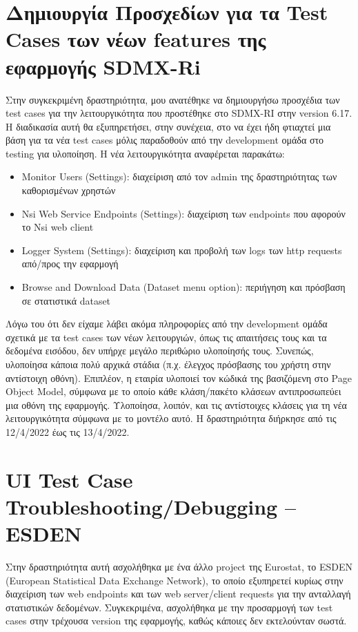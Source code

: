 \section {Δημιουργία Προσχεδίων για τα Test Cases των νέων features της εφαρμογής SDMX-Ri}
Στην συγκεκριμένη δραστηριότητα, μου ανατέθηκε να δημιουργήσω προσχέδια των test cases για την λειτουργικότητα που προστέθηκε στο SDMX-RI στην 
version 6.17. Η διαδικασία αυτή θα εξυπηρετήσει, στην συνέχεια, στο να έχει ήδη φτιαχτεί μια βάση για τα νέα test cases μόλις παραδοθούν από 
την development ομάδα στο testing για υλοποίηση. Η νέα λειτουργικότητα αναφέρεται παρακάτω:
\begin{itemize}
    \item Monitor Users (Settings): διαχείριση από τον admin της δραστηριότητας των καθορισμένων χρηστών
    \item Nsi Web Service Endpoints (Settings): διαχείριση των endpoints που αφορούν το Nsi web client
	\item Logger System (Settings): διαχείριση και προβολή των logs των http requests από/προς την εφαρμογή
	\item Browse and Download Data (Dataset menu option): περιήγηση και πρόσβαση σε στατιστικά dataset
\end{itemize}
Λόγω του ότι δεν είχαμε λάβει ακόμα πληροφορίες από την development ομάδα σχετικά με τα test cases των νέων λειτουργιών, όπως τις απαιτήσεις 
τους και τα δεδομένα εισόδου, δεν υπήρχε μεγάλο περιθώριο υλοποίησής τους. Συνεπώς, υλοποίησα κάποια πολύ αρχικά στάδια (π.χ. έλεγχος πρόσβασης 
του χρήστη στην αντίστοιχη οθόνη). Επιπλέον, η εταιρία υλοποιεί τον κώδικά της βασιζόμενη στο Page Object Model, σύμφωνα με το οποίο κάθε 
κλάση/πακέτο κλάσεων αντιπροσωπεύει μια οθόνη της εφαρμογής. Υλοποίησα, λοιπόν, και τις αντίστοιχες κλάσεις για τη νέα λειτουργικότητα σύμφωνα 
με το μοντέλο αυτό. Η δραστηριότητα διήρκησε από τις 12/4/2022 έως τις 13/4/2022.

\section {UI Test Case Troubleshooting/Debugging – ESDEN}
Στην δραστηριότητα αυτή ασχολήθηκα με ένα άλλο project της Eurostat, το ESDEN (European Statistical Data Exchange Network), το οποίο εξυπηρετεί 
κυρίως στην διαχείριση των web endpoints και των web server/client requests για την ανταλλαγή στατιστικών δεδομένων. Συγκεκριμένα, ασχολήθηκα 
με την προσαρμογή των test cases στην τρέχουσα version της εφαρμογής, καθώς κάποιες δεν εκτελούνταν σωστά. \\

